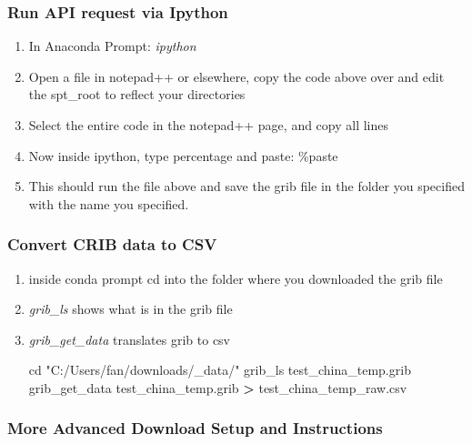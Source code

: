 \documentclass[
]{book}
\newenvironment{Shaded}{\begin{snugshade}}{\end{snugshade}}
\newcommand{\BuiltInTok}[1]{#1}
\newcommand{\ExtensionTok}[1]{#1}
\newcommand{\NormalTok}[1]{#1}
\newcommand{\OperatorTok}[1]{\textcolor[rgb]{0.81,0.36,0.00}{\textbf{#1}}}
\newcommand{\StringTok}[1]{\textcolor[rgb]{0.31,0.60,0.02}{#1}}
\providecommand{\tightlist}{%
  \setlength{\itemsep}{0pt}\setlength{\parskip}{0pt}}
\begin{document}
\hypertarget{run-api-request-via-ipython}{%
\subsubsection{Run API request via Ipython}\label{run-api-request-via-ipython}}

\begin{enumerate}
\def\labelenumi{\arabic{enumi}.}
\tightlist
\item
  In Anaconda Prompt: \emph{ipython}
\item
  Open a file in notepad++ or elsewhere, copy the code above over and edit the spt\_root to reflect your directories
\item
  Select the entire code in the notepad++ page, and copy all lines
\item
  Now inside ipython, type percentage and paste: \%paste
\item
  This should run the file above and save the grib file in the folder you specified with the name you specified.
\end{enumerate}

\hypertarget{convert-crib-data-to-csv}{%
\subsubsection{Convert CRIB data to CSV}\label{convert-crib-data-to-csv}}

\begin{enumerate}
\def\labelenumi{\arabic{enumi}.}
\item
  inside conda prompt cd into the folder where you downloaded the grib file
\item
  \emph{grib\_ls} shows what is in the grib file
\item
  \emph{grib\_get\_data} translates grib to csv

\begin{Shaded}
\begin{Highlighting}[]
\BuiltInTok{cd} \StringTok{"C:/Users/fan/downloads/_data/"}
\ExtensionTok{grib_ls}\NormalTok{ test_china_temp.grib}
\ExtensionTok{grib_get_data}\NormalTok{ test_china_temp.grib }\OperatorTok{>}\NormalTok{ test_china_temp_raw.csv}
\end{Highlighting}
\end{Shaded}
\end{enumerate}

\hypertarget{more-advanced-download-setup-and-instructions}{%
\subsubsection{More Advanced Download Setup and Instructions}\label{more-advanced-download-setup-and-instructions}}
\end{document}
